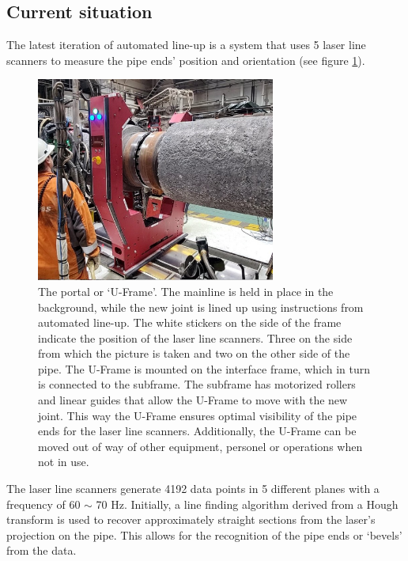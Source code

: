 \subsection{Current situation}
The latest iteration of automated line-up is a system that uses 5 laser line scanners to measure the pipe ends' position and orientation
(see figure \ref{fig:portal}).
\begin{figure}[H]
      \centering
      \includegraphics[width=0.7\textwidth]{images/side_view_final_lineup.jpg}
      \caption{The portal or `U-Frame'. The mainline is held in place in the background,
            while the new joint is lined up using instructions from automated line-up.
            The white stickers on the side of the frame indicate the position of the laser line scanners.
            Three on the side from which the picture is taken and two on the other side of the pipe.
            The U-Frame is mounted on the interface frame, which in turn is connected to the subframe.
            The subframe has motorized rollers and linear guides that allow the U-Frame to move with the new joint.
            This way the U-Frame ensures optimal visibility of the pipe ends for the laser line scanners. Additionally,
            the U-Frame can be moved out of way of other equipment, personel or operations when not in use.}
      \label{fig:portal}
\end{figure}

The laser line scanners generate 4192 data points in 5 different planes with a frequency of 60 $\sim$ 70 Hz. Initially,
a line finding algorithm derived from a Hough transform \cite{hough_transform} is used to recover approximately
straight sections from the laser's projection on the pipe. This allows for the recognition of the pipe ends or `bevels'
from the data.

